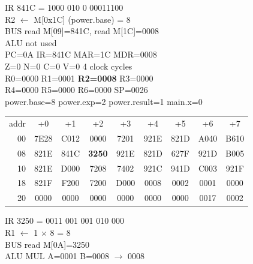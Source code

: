 \noindent\begin{tcolorbox}[stepbox, title={Step 14 \hfill PC 09 \quad LD R2, power.base}]
\textcolor{dim}{IR} 841C = 1000 010 0 00011100\\
R2 $\leftarrow$ M[0x1C] (power.base) = 8\\
\textcolor{dim}{BUS} read M[09]=841C, read M[1C]=0008\\
\textcolor{dim}{ALU} \textcolor{dim}{not used}\\
PC=0A IR=841C MAR=1C MDR=0008\\
Z=0 N=0 C=0 V=0 \hfill \textcolor{dim}{4 clock cycles}\\
R0=0000 R1=0001 \textcolor{wrt}{\textbf{R2=0008}} R3=0000\\
R4=0000 R5=0000 R6=0000 SP=0026\\
\textcolor{dim}{power.base=8  power.exp=2  power.result=1  main.x=0}\\[1pt]
{\setlength{\tabcolsep}{1.6pt}\begin{tabular}{@{}r*{8}{c}@{}}
\textcolor{dim}{addr} & \textcolor{dim}{+0} & \textcolor{dim}{+1} & \textcolor{dim}{+2} & \textcolor{dim}{+3} & \textcolor{dim}{+4} & \textcolor{dim}{+5} & \textcolor{dim}{+6} & \textcolor{dim}{+7}\\
\textcolor{dim}{00} & 7E28 & C012 & 0000 & 7201 & 921E & 821D & A040 & B610\\
\textcolor{dim}{08} & 821E & 841C & \cellcolor{pcc}\textbf{3250} & 921E & 821D & 627F & 921D & B005\\
\textcolor{dim}{10} & 821E & D000 & 7208 & 7402 & 921C & 941D & C003 & 921F\\
\textcolor{dim}{18} & 821F & F200 & 7200 & D000 & \cellcolor{datac}0008 & \cellcolor{datac}0002 & \cellcolor{datac}0001 & \cellcolor{datac}0000\\
\textcolor{dim}{20} & \cellcolor{stackc}0000 & \cellcolor{stackc}0000 & \cellcolor{stackc}0000 & \cellcolor{stackc}0000 & \cellcolor{stackc}0000 & \cellcolor{stackc}0000 & \cellcolor{stackc}0017 & \cellcolor{stackc}0002\\
\end{tabular}}
\end{tcolorbox}\hfill\begin{tcolorbox}[stepbox, title={Step 15 \hfill PC 0A \quad MUL R1, R1, R2}]
\textcolor{dim}{IR} 3250 = 0011 001 001 010 000\\
R1 $\leftarrow$ 1 $\times$ 8 = 8\\
\textcolor{dim}{BUS} read M[0A]=3250\\
\textcolor{dim}{ALU} MUL A=0001 B=0008 $\rightarrow$ 0008\\

\end{tcolorbox}
